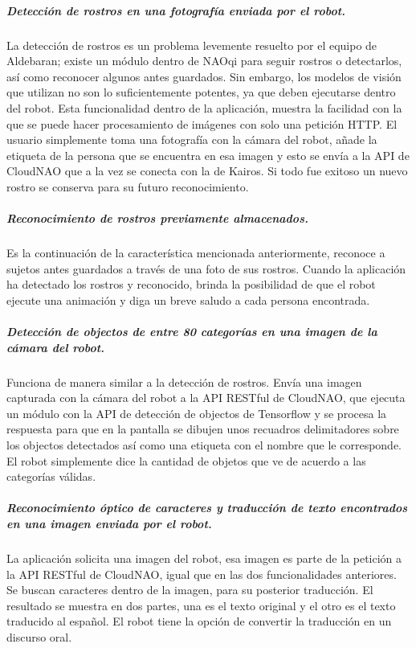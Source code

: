\subparagraph{Detección de rostros en una fotografía enviada por el robot.}
\label{\detokenize{users_docs:deteccion-de-rostros-en-una-fotografia-enviada-por-el-robot}}
La detección  de rostros es un problema levemente resuelto por el equipo
de Aldebaran; existe un módulo dentro de NAOqi para seguir rostros o detectarlos,
así como reconocer algunos antes guardados. Sin embargo, los modelos de visión
que utilizan no son lo suficientemente potentes, ya que deben ejecutarse dentro
del robot. Esta funcionalidad dentro de la aplicación, muestra la facilidad con
la que se puede hacer procesamiento de imágenes con solo una petición HTTP.
El usuario simplemente toma una fotografía con la cámara del robot, añade
la etiqueta de la persona que se encuentra en esa imagen y esto se envía
a la API de CloudNAO que a la vez se conecta con la de Kairos. Si todo fue
exitoso un nuevo rostro se conserva para su futuro reconocimiento.


\subparagraph{Reconocimiento de rostros previamente almacenados.}
\label{\detokenize{users_docs:reconocimiento-de-rostros-previamente-almacenados}}
Es la continuación de la característica mencionada anteriormente, reconoce
a sujetos antes guardados a través de una foto de sus rostros. Cuando
la aplicación ha detectado los rostros y reconocido, brinda la posibilidad
de que el robot ejecute una animación y diga un breve saludo a cada persona
encontrada.


\subparagraph{Detección de objectos de entre 80 categorías en una imagen de la cámara del robot.}
\label{\detokenize{users_docs:deteccion-de-objectos-de-entre-80-categorias-en-una-imagen-de-la-camara-del-robot}}
Funciona de manera similar a la detección de rostros. Envía una imagen capturada
con la cámara del robot a la API RESTful de CloudNAO, que ejecuta un módulo
con la API de detección de objectos de Tensorflow y se procesa la respuesta para
que en la pantalla se dibujen unos
recuadros delimitadores sobre los objectos detectados así como una etiqueta
con el nombre que le corresponde. El robot simplemente
dice la cantidad de objetos que ve de acuerdo a las categorías válidas.


\subparagraph{Reconocimiento óptico de caracteres y traducción de texto encontrados en una imagen enviada por el robot.}
\label{\detokenize{users_docs:reconocimiento-optico-de-caracteres-y-traduccion-de-texto-encontrados-en-una-imagen-enviada-por-el-robot}}
La aplicación solicita una imagen del robot, esa imagen es parte de la petición
a la API RESTful de CloudNAO, igual que en las dos funcionalidades anteriores.
Se buscan caracteres dentro de la imagen, para su posterior traducción.
El resultado se muestra en dos partes, una es el texto original y el otro
es el texto traducido al español. El robot tiene la opción de convertir la
traducción en un discurso oral.


